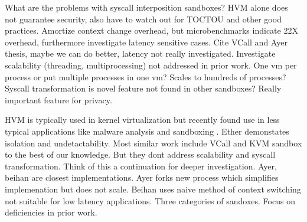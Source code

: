\documentclass{article}
\begin{document}
What are the problems with syscall interposition sandboxes?
HVM alone does not guarantee security, also have to watch out for TOCTOU and other good practices.
Amortize context change overhead, but microbenchmarks indicate 22X overhead, furthermore investigate latency sensitive cases.
Cite VCall and Ayer thesis, maybe we can do better, latency not really investigated.
Investigate scalability (threading, multiprocessing) not addressed in prior work. One vm per process or put multiple processes in one vm? Scales to hundreds of processes?
Syscall transformation is novel feature not found in other sandboxes? Really important feature for privacy.

HVM is typically used in kernel virtualization but recently found use in less typical applications like malware analysis \cite{Ether2008} and sandboxing \cite{Ayer2012, VCall2010}.
Ether demonstates isolation and undetactability.
Most similar work include VCall and KVM sandbox to the best of our knowledge.
But they dont address scalability and syscall transformation.
Think of this a continuation for deeper investigation.
Ayer, beihan are closest implementations.
Ayer forks new process which simplifies implemenation but does not scale.
Beihan uses naive method of context switching not suitable for low latency applications.
Three categories of sandoxes. Focus on deficiencies in prior work.


\fi
\end{document}
